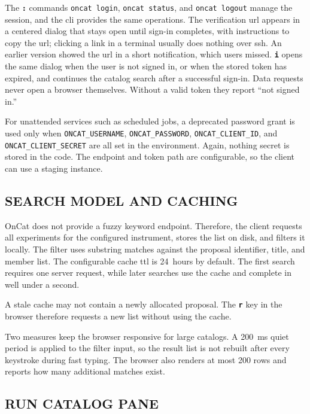 \documentclass[tm]{ornltm}
\newcommand{\key}[1]{\textbf{\texttt{#1}}}
\begin{document}
The \key{:} commands \texttt{oncat login}, \texttt{oncat status}, and
\texttt{oncat logout} manage the session, and the \ac{cli} provides the same
operations. The verification \ac{url} appears in a centered dialog that stays
open until sign-in completes, with instructions to copy the \ac{url}; clicking
a link in a terminal usually does nothing over \ac{ssh}. An earlier version
showed the \ac{url} in a short notification, which users missed. \key{i} opens
the same dialog when the user is not signed in, or when the stored token has
expired, and continues the catalog search after a successful sign-in. Data
requests never open a browser themselves. Without a valid token they report
``not signed in.''

For unattended services such as scheduled jobs, a deprecated password grant is
used only when \texttt{ONCAT\_USERNAME}, \texttt{ONCAT\_PASSWORD},
\texttt{ONCAT\_CLIENT\_ID}, and \texttt{ONCAT\_CLIENT\_SECRET} are all set in the
environment. Again, nothing secret is stored in the code. The endpoint and
token path are configurable, so the client can use a staging instance.

\subsection{SEARCH MODEL AND CACHING}

OnCat does not provide a fuzzy keyword endpoint. Therefore, the client requests
all experiments for the configured instrument, stores the list on disk, and
filters it locally. The filter uses substring matches against the proposal
identifier, title, and member list. The configurable cache \ac{ttl} is 24~hours
by default. The first search requires one server request, while later searches
use the cache and complete in well under a second.

A stale cache may not contain a newly allocated proposal. The \key{r} key in the
browser therefore requests a new list without using the cache.

Two measures keep the browser responsive for large catalogs. A 200~ms quiet
period is applied to the filter input, so the result list is not rebuilt after
every keystroke during fast typing. The browser also renders at most 200 rows
and reports how many additional matches exist.

\subsection{RUN CATALOG PANE}
\end{document}
